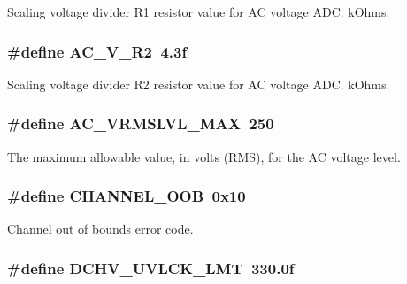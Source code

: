 Scaling voltage divider R1 resistor value for A\-C voltage A\-D\-C. k\-Ohms. \hypertarget{a00043_a34b8eef04869757d7d21a1e858ba98e7}{
\subsubsection[{A\-C\-\_\-\-V\-\_\-\-R2}]{\setlength{\rightskip}{0pt plus 5cm}\#define A\-C\-\_\-\-V\-\_\-\-R2~4.\-3f}}\label{a00043_a34b8eef04869757d7d21a1e858ba98e7}
Scaling voltage divider R2 resistor value for A\-C voltage A\-D\-C. k\-Ohms. \hypertarget{a00043_afb09d50c3567117fe1f679ab1924d4ec}{
\subsubsection[{A\-C\-\_\-\-V\-R\-M\-S\-L\-V\-L\-\_\-\-M\-A\-X}]{\setlength{\rightskip}{0pt plus 5cm}\#define A\-C\-\_\-\-V\-R\-M\-S\-L\-V\-L\-\_\-\-M\-A\-X~250}}\label{a00043_afb09d50c3567117fe1f679ab1924d4ec}
The maximum allowable value, in volts (R\-M\-S), for the A\-C voltage level. \hypertarget{a00043_a5f4c019658ca5a8eff4bfc3d96d489a0}{
\subsubsection[{C\-H\-A\-N\-N\-E\-L\-\_\-\-O\-O\-B}]{\setlength{\rightskip}{0pt plus 5cm}\#define C\-H\-A\-N\-N\-E\-L\-\_\-\-O\-O\-B~0x10}}\label{a00043_a5f4c019658ca5a8eff4bfc3d96d489a0}
Channel out of bounds error code. \hypertarget{a00043_a019110624cdfbea9003fd450564e103a}{
\subsubsection[{D\-C\-H\-V\-\_\-\-U\-V\-L\-C\-K\-\_\-\-L\-M\-T}]{\setlength{\rightskip}{0pt plus 5cm}\#define D\-C\-H\-V\-\_\-\-U\-V\-L\-C\-K\-\_\-\-L\-M\-T~330.\-0f}}\label{a00043_a019110624cdfbea9003fd450564e103a}

